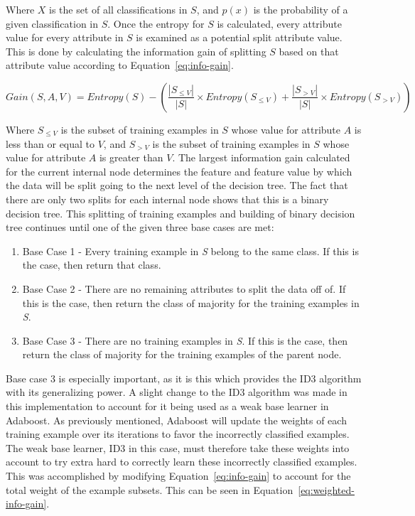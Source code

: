 \documentclass[a4paper]{article}
\begin{document}
Where $X$ is the set of all classifications in $S$, and $p(x)$ is the probability of a given classification in $S$. Once the entropy for $S$ is calculated, every attribute value for every attribute in $S$ is examined as a potential split attribute value. This is done by calculating the information gain of splitting $S$ based on that attribute value according to Equation~\ref{eq:info-gain}.

\begin{equation}
    \label{eq:info-gain}
    Gain(S, A, V) = Entropy(S) - \left(\frac{|S_{\le V}|}{|S|}\times Entropy(S_{\le V}) + \frac{|S_{> V}|}{|S|}\times Entropy(S_{> V}) \right)
\end{equation}

Where $S_{\le V}$ is the subset of training examples in $S$ whose value for attribute $A$ is less than or equal to $V$, and $S_{> V}$ is the subset of training examples in $S$ whose value for attribute $A$ is greater than $V$. The largest information gain calculated for the current internal node determines the feature and feature value by which the data will be split going to the next level of the decision tree. The fact that there are only two splits for each internal node shows that this is a binary decision tree. This splitting of training examples and building of binary decision tree continues until one of the given three base cases are met:
\begin{enumerate}
    \item Base Case 1 - Every training example in \textit{S} belong to the same class. If this is the case, then return that class.

    \item Base Case 2 - There are no remaining attributes to split the data off of. If this is the case, then return the class of majority for the training examples in \textit{S}.

    \item Base Case 3 - There are no training examples in \textit{S}. If this is the case, then return the class of majority for the training examples of the parent node.
\end{enumerate}
Base case 3 is especially important, as it is this which provides the ID3 algorithm with its generalizing power. A slight change to the ID3 algorithm was made in this implementation to account for it being used as a weak base learner in Adaboost. As previously mentioned, Adaboost will update the weights of each training example over its iterations to favor the incorrectly classified examples. The weak base learner, ID3 in this case, must therefore take these weights into account to try extra hard to correctly learn these incorrectly classified examples. This was accomplished by modifying Equation~\ref{eq:info-gain} to account for the total weight of the example subsets. This can be seen in Equation~\ref{eq:weighted-info-gain}.
\end{document}
